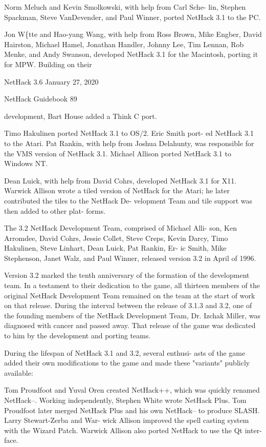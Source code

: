 \documentclass[11pt]{article}
\begin{document}
   Norm Meluch and Kevin Smolkowski, with help from Carl Sche-
lin, Stephen Spackman, Steve VanDevender, and Paul Winner, ported
NetHack 3.1 to the PC.

   Jon W\{tte and Hao-yang Wang, with help from Ross Brown, Mike
Engber, David Hairston, Michael Hamel, Jonathan Handler, Johnny
Lee, Tim Lennan, Rob Menke, and Andy Swanson, developed NetHack
3.1 for the Macintosh, porting it for MPW. Building on their


NetHack 3.6                   January 27, 2020





NetHack Guidebook                       89



development, Bart House added a Think C port.

   Timo Hakulinen ported NetHack 3.1 to OS/2. Eric Smith port-
ed NetHack 3.1 to the Atari. Pat Rankin, with help from Joshua
Delahunty, was responsible for the VMS version of NetHack 3.1.
Michael Allison ported NetHack 3.1 to Windows NT.

   Dean Luick, with help from David Cohrs, developed NetHack
3.1 for X11. Warwick Allison wrote a tiled version of NetHack
for the Atari; he later contributed the tiles to the NetHack De-
velopment Team and tile support was then added to other plat-
forms.

   The 3.2 NetHack Development Team, comprised of Michael Alli-
son, Ken Arromdee, David Cohrs, Jessie Collet, Steve Creps, Kevin
Darcy, Timo Hakulinen, Steve Linhart, Dean Luick, Pat Rankin, Er-
ic Smith, Mike Stephenson, Janet Walz, and Paul Winner, released
version 3.2 in April of 1996.

   Version 3.2 marked the tenth anniversary of the formation of
the development team. In a testament to their dedication to the
game, all thirteen members of the original NetHack Development
Team remained on the team at the start of work on that release.
During the interval between the release of 3.1.3 and 3.2, one of
the founding members of the NetHack Development Team, Dr. Izchak
Miller, was diagnosed with cancer and passed away. That release
of the game was dedicated to him by the development and porting
teams.

   During the lifespan of NetHack 3.1 and 3.2, several enthusi-
asts of the game added their own modifications to the game and
made these "variants" publicly available:

   Tom Proudfoot and Yuval Oren created NetHack++, which was
quickly renamed NetHack--. Working independently, Stephen White
wrote NetHack Plus. Tom Proudfoot later merged NetHack Plus and
his own NetHack-- to produce SLASH. Larry Stewart-Zerba and War-
wick Allison improved the spell casting system with the Wizard
Patch. Warwick Allison also ported NetHack to use the Qt inter-
face.
\end{document}
